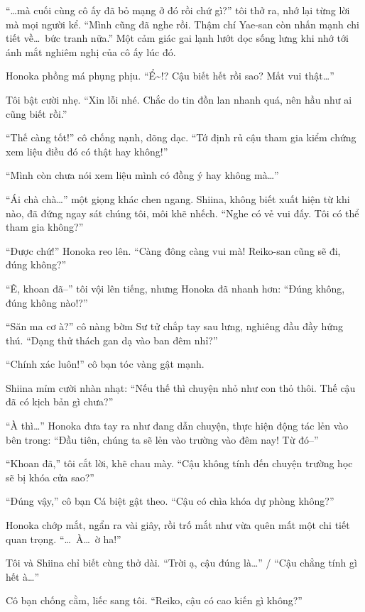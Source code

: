 \documentclass[../main.tex]{subfiles}
\begin{document}
``\dots mà cuối cùng cô ấy đã bỏ mạng ở đó rồi chứ gì?'' tôi thở ra, nhớ lại từng lời mà mọi người kể. ``Mình cũng đã nghe rồi. Thậm chí Yae-san còn nhấn mạnh chi tiết về\dots\ bức tranh nữa.'' Một cảm giác gai lạnh lướt dọc sống lưng khi nhớ tới ánh mắt nghiêm nghị của cô ấy lúc đó.

Honoka phồng má phụng phịu. ``Ể\~{}!? Cậu biết hết rồi sao? Mất vui thật\dots''

Tôi bật cười nhẹ. ``Xin lỗi nhé. Chắc do tin đồn lan nhanh quá, nên hầu như ai cũng biết rồi.''

``Thế càng tốt!'' cô chống nạnh, dõng dạc. ``Tớ định rủ cậu tham gia kiểm chứng xem liệu điều đó có thật hay không!''

``Mình còn chưa nói xem liệu mình có đồng ý hay không mà\dots''

``Ái chà chà\dots'' một giọng khác chen ngang. Shiina, không biết xuất hiện từ khi nào, đã đứng ngay sát chúng tôi, môi khẽ nhếch. ``Nghe có vẻ vui đấy. Tôi có thể tham gia không?''

``Được chứ!'' Honoka reo lên. ``Càng đông càng vui mà! Reiko-san cũng sẽ đi, đúng không?''

``Ê, khoan đã--'' tôi vội lên tiếng, nhưng Honoka đã nhanh hơn: ``Đúng không, đúng không nào!?''

``Săn ma cơ à?'' cô nàng bờm Sư tử chắp tay sau lưng, nghiêng đầu đầy hứng thú. ``Dạng thử thách gan dạ vào ban đêm nhỉ?''

``Chính xác luôn!'' cô bạn tóc vàng gật mạnh.

Shiina mỉm cười nhàn nhạt: ``Nếu thế thì chuyện nhỏ như con thỏ thôi. Thế cậu đã có kịch bản gì chưa?''

``À thì\dots'' Honoka đưa tay ra như đang dẫn chuyện, thực hiện động tác lẻn vào bên trong: ``Đầu tiên, chúng ta sẽ lẻn vào trường vào đêm nay! Từ đó--''

``Khoan đã,'' tôi cắt lời, khẽ chau mày. ``Cậu không tính đến chuyện trường học sẽ bị khóa cửa sao?''

``Đúng vậy,'' cô bạn Cá biệt gật theo. ``Cậu có chìa khóa dự phòng không?''

Honoka chớp mắt, ngẩn ra vài giây, rồi trố mắt như vừa quên mất một chi tiết quan trọng. ``\dots\ À\dots\ ờ ha!''

Tôi và Shiina chỉ biết cùng thở dài. ``Trời ạ, cậu đúng là\dots'' / ``Cậu chẳng tính gì hết à\dots''

Cô bạn chống cằm, liếc sang tôi. ``Reiko, cậu có cao kiến gì không?''
\end{document}
